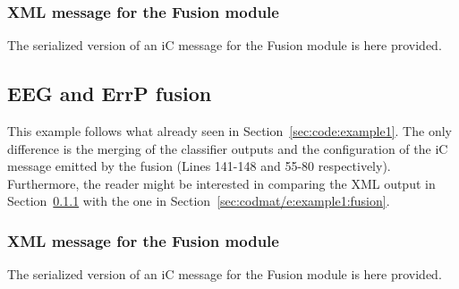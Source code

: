 \documentclass[a4paper,10pt]{article}
\begin{document}
\subsubsection{XML message for the Fusion module}
\label{sec:code:example1:fusion}
The serialized version of an iC message for the Fusion module is here provided.


\subsection{EEG and ErrP fusion}
\label{sec:code:example2}
This example follows what already seen in Section~\ref{sec:code:example1}. The
only difference is the merging of the classifier outputs and the configuration
of the iC message emitted by the fusion (Lines 141-148 and 55-80 respectively).
Furthermore, the reader might be interested in comparing the XML output in
Section~\ref{sec:code:example2:fusion} with the one in
Section~\ref{sec:codmat/e:example1:fusion}.


\subsubsection{XML message for the Fusion module}
\label{sec:code:example2:fusion}
The serialized version of an iC message for the Fusion module is here provided.

\end{document}
